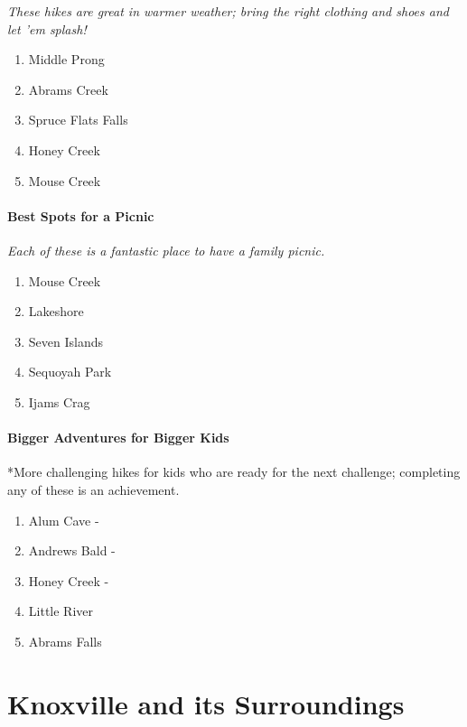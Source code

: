 \documentclass[
  letterpaper,
  DIV=11,
  numbers=noendperiod]{scrreprt}
\providecommand{\tightlist}{%
  \setlength{\itemsep}{0pt}\setlength{\parskip}{0pt}}\usepackage{longtable,booktabs,array}
\begin{document}
\emph{These hikes are great in warmer weather; bring the right clothing
and shoes and let 'em splash!}

\begin{enumerate}
\def\labelenumi{\arabic{enumi}.}
\tightlist
\item
  Middle Prong
\item
  Abrams Creek
\item
  Spruce Flats Falls
\item
  Honey Creek
\item
  Mouse Creek
\end{enumerate}

\subsection{Best Spots for a Picnic}\label{best-spots-for-a-picnic}

\emph{Each of these is a fantastic place to have a family picnic.}

\begin{enumerate}
\def\labelenumi{\arabic{enumi}.}
\tightlist
\item
  Mouse Creek
\item
  Lakeshore
\item
  Seven Islands
\item
  Sequoyah Park
\item
  Ijams Crag
\end{enumerate}

\subsection{Bigger Adventures for Bigger
Kids}\label{bigger-adventures-for-bigger-kids}

*More challenging hikes for kids who are ready for the next challenge;
completing any of these is an achievement.

\begin{enumerate}
\def\labelenumi{\arabic{enumi}.}
\tightlist
\item
  Alum Cave -
\item
  Andrews Bald -
\item
  Honey Creek -
\item
  Little River
\item
  Abrams Falls
\end{enumerate}

\part{Knoxville and its Surroundings}
\end{document}

